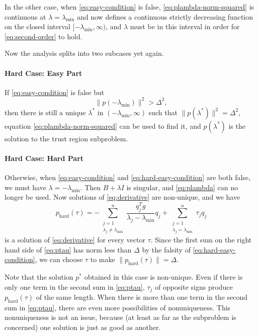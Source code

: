\documentclass[11pt]{article}
\begin{document}
In the other case, when \eqref{eq:easy-condition} is false,
\eqref{eq:plambda-norm-squared} is continuous
at $\lambda = \lambda_{\text{min}}$ and now 
defines a continuous
strictly decreasing function on
the closed interval $[- \lambda_{\text{min}}, \infty)$, and $\lambda$
must be in this interval in order for \eqref{eq:second-order} to hold.

Now the analysis splits into two subcases yet again.

\paragraph{Hard Case: Easy Part}

If \eqref{eq:easy-condition} is false but
\begin{equation} \label{eq:hard-easy-condition}
   \lVert p(- \lambda_{\text{min}}) \rVert^2 > \Delta^2,
\end{equation}
then there is still a unique $\lambda^*$ in $(- \lambda_{\text{min}}, \infty)$
such that $\lVert p(\lambda^*) \rVert^2 = \Delta^2$,
equation \eqref{eq:plambda-norm-squared} can be used to find it,
and $p(\lambda^*)$ is the
solution to the trust region subproblem.

\paragraph{Hard Case: Hard Part}

Otherwise, when \eqref{eq:easy-condition} and \eqref{eq:hard-easy-condition}
are both false,
we must have $\lambda = - \lambda_{\text{min}}$.
Then $B + \lambda I$ is singular, and \eqref{eq:plambda}
can no longer be used.  Now solutions of \eqref{eq:derivative}
are non-unique, and we have
\begin{equation} \label{eq:ptau}
   p_{\text{hard}}(\tau)
   =
   - \sum_{\substack{j = 1 \\ \lambda_j \neq \lambda_{\text{min}}}}^n
   \frac{q_j^T g}{\lambda_j - \lambda_{\text{min}}} q_j
   +
   \sum_{\substack{j = 1 \\ \lambda_j = \lambda_{\text{min}}}}^n
   \tau_j q_j
\end{equation}
is a solution of \eqref{eq:derivative} for every vector $\tau$.
Since the first sum on the right hand side of \eqref{eq:ptau} has
norm less than $\Delta$ by the falsity of \eqref{eq:hard-easy-condition},
we can choose $\tau$ to make $\lVert p_{\text{hard}}(\tau) \rVert = \Delta$.

Note that the solution $p^*$ obtained in this case is non-unique.
Even if there is only one term in the second sum in \eqref{eq:ptau},
$\tau_j$ of opposite signs produce $p_{\text{hard}}(\tau)$ of the same
length.
When there is more than one term in the second sum in \eqref{eq:ptau},
there are even more possibilities of nonuniqueness.
This nonuniqueness is not an issue, because (at least as far as the subproblem
is concerned) one solution is just as good as another.
\end{document}
